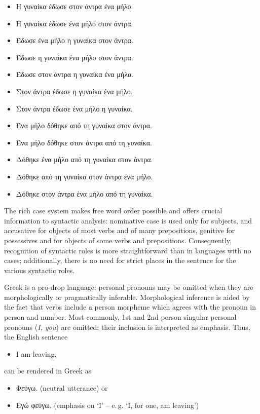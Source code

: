 \begin{multicols}{2}
\begin{itemize}    
\item Η γυναίκα έδωσε στον άντρα ένα μήλο.
\item Η γυναίκα έδωσε ένα μήλο στον άντρα.
\item Έδωσε ένα μήλο η γυναίκα στον άντρα.
\item Έδωσε η γυναίκα ένα μήλο στον άντρα.
\item Έδωσε στον άντρα η γυναίκα ένα μήλο.
\item Στον άντρα έδωσε η γυναίκα ένα μήλο.
\item Στον άντρα έδωσε ένα μήλο η γυναίκα.
\item Ένα μήλο δόθηκε από τη γυναίκα στον άντρα.
\item Ένα μήλο δόθηκε στον άντρα από τη γυναίκα.
\item Δόθηκε ένα μήλο από τη γυναίκα στον άντρα.
\item Δόθηκε από τη γυναίκα στον άντρα ένα μήλο.
\item Δόθηκε στον άντρα ένα μήλο από τη γυναίκα.
\end{itemize}
 
The rich case system makes free word order possible and offers crucial information to syntactic analysis: nominative case is used only for subjects, and accusative for objects of most verbs and of many prepositions, genitive for possessives and for objects of some verbs and prepositions. Consequently, recognition of syntactic roles is more straightforward than in languages with no cases; additionally, there is no need for strict places in the sentence for the various syntactic roles.

Greek is a pro-drop language: personal pronouns may be omitted when they are morphologically or pragmatically inferable. Morphological inference is aided by the fact that verbs include a person morpheme which agrees with the pronoun in person and number. Most commonly, 1st and 2nd person singular personal pronouns (\textit{I, you}) are omitted; their inclusion is interpreted as emphasis. Thus, the English sentence 

\begin{itemize}
\item[] I am leaving.
\end{itemize}

can be rendered in Greek as

\begin{itemize}
\item Φεύγω. (neutral utterance) or 
\item Εγώ φεύγω. (emphasis on ‘I’ – e.\,g. ‘I, for one, am leaving’)
\end{itemize}


\end{multicols}
